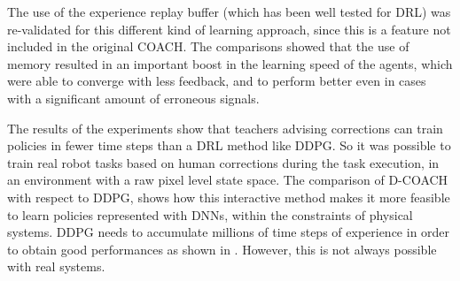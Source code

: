 The use of the experience replay buffer (which has been well tested for DRL) was re-validated for this different kind of learning approach, since this is a feature not included in the original COACH. The comparisons showed that the use of memory resulted in an important boost in the learning speed of the agents, which were able to converge with less feedback, and to perform better even in cases with a significant amount of erroneous signals.  

The results of the experiments show that teachers advising corrections can train policies in fewer time steps than a DRL method like DDPG. So it was possible to train real robot tasks based on human corrections during the task execution, in an environment with a raw pixel level state space. 
The comparison of D-COACH with respect to DDPG, shows how this interactive method makes it more feasible to learn policies represented with DNNs, within the constraints of physical systems. DDPG needs to accumulate millions of time steps of experience in order to obtain good performances as shown in \cite{Lillicrap2015}. However, this is not always possible with real systems.